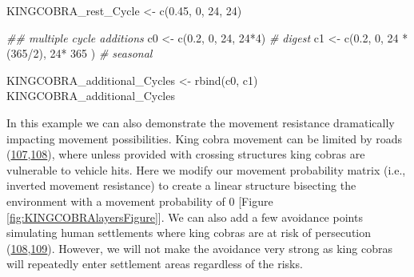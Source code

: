 \documentclass[10pt,a4paper]{article}
\newenvironment{Shaded}{}{}
\newcommand{\CommentTok}[1]{\textit{#1}}
\newcommand{\DecValTok}[1]{#1}
\newcommand{\DocumentationTok}[1]{\textit{#1}}
\newcommand{\FloatTok}[1]{#1}
\newcommand{\FunctionTok}[1]{#1}
\newcommand{\NormalTok}[1]{#1}
\newcommand{\OtherTok}[1]{#1}
\newcommand{\SpecialCharTok}[1]{#1}
\begin{document}
\begin{Shaded}
\begin{Highlighting}[]
\NormalTok{KINGCOBRA\_rest\_Cycle }\OtherTok{\textless{}{-}} \FunctionTok{c}\NormalTok{(}\FloatTok{0.45}\NormalTok{, }\DecValTok{0}\NormalTok{, }\DecValTok{24}\NormalTok{, }\DecValTok{24}\NormalTok{)}

\DocumentationTok{\#\# multiple cycle additions}
\NormalTok{c0 }\OtherTok{\textless{}{-}} \FunctionTok{c}\NormalTok{(}\FloatTok{0.2}\NormalTok{, }\DecValTok{0}\NormalTok{, }\DecValTok{24}\NormalTok{, }\DecValTok{24}\SpecialCharTok{*}\DecValTok{4}\NormalTok{) }\CommentTok{\# digest}
\NormalTok{c1 }\OtherTok{\textless{}{-}} \FunctionTok{c}\NormalTok{(}\FloatTok{0.2}\NormalTok{, }\DecValTok{0}\NormalTok{, }\DecValTok{24} \SpecialCharTok{*}\NormalTok{ (}\DecValTok{365}\SpecialCharTok{/}\DecValTok{2}\NormalTok{), }\DecValTok{24}\SpecialCharTok{*} \DecValTok{365}\NormalTok{ ) }\CommentTok{\# seasonal}

\NormalTok{KINGCOBRA\_additional\_Cycles }\OtherTok{\textless{}{-}} \FunctionTok{rbind}\NormalTok{(c0, c1)}
\NormalTok{KINGCOBRA\_additional\_Cycles}
\end{Highlighting}
\end{Shaded}

In this example we can also demonstrate the movement resistance dramatically impacting movement possibilities.
King cobra movement can be limited by roads (\protect\hyperlink{ref-jones_how_2022}{107},\protect\hyperlink{ref-Marshall2018b}{108}), where unless provided with crossing structures king cobras are vulnerable to vehicle hits.
Here we modify our movement probability matrix (i.e., inverted movement resistance) to create a linear structure bisecting the environment with a movement probability of 0 {[}Figure \ref{fig:KINGCOBRAlayersFigure}{]}.
We can also add a few avoidance points simulating human settlements where king cobras are at risk of persecution (\protect\hyperlink{ref-Marshall2018b}{108},\protect\hyperlink{ref-Shankar2013}{109}).
However, we will not make the avoidance very strong as king cobras will repeatedly enter settlement areas regardless of the risks.
\end{document}
